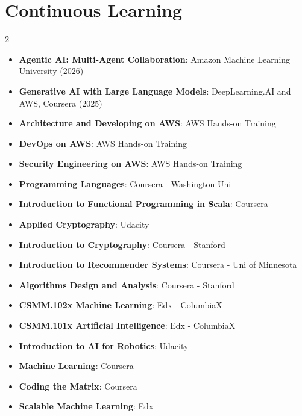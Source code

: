 \documentclass[letterpaper,11pt]{article}
\newcommand{\resumeColItem}[2]{\item\small{\textbf{#1}{: #2}}\par\vspace{-6pt}}
\newcommand{\resumeSubHeadingListStart}{\begin{itemize}[leftmargin=*]}
\newcommand{\resumeSubHeadingListEnd}{\end{itemize}}
\begin{document}
  
\section{Continuous Learning \footnotemark}
  \begin{multicols}{2}
  \raggedcolumns
   \resumeSubHeadingListStart
	\resumeColItem{Agentic AI: Multi-Agent Collaboration}{Amazon Machine Learning University (2026)}
    \resumeColItem{Generative AI with Large Language Models}{DeepLearning.AI and AWS, Coursera (2025)}
    \resumeColItem{Architecture and Developing on AWS}{AWS Hands-on Training}
	\resumeColItem{DevOps on AWS}{AWS Hands-on Training}
	\resumeColItem{Security Engineering on AWS}{AWS Hands-on Training}
    \resumeColItem{Programming Languages}{Coursera - Washington Uni}
    \resumeColItem{Introduction to Functional Programming in Scala}{Coursera}
    \resumeColItem{Applied Cryptography}{Udacity}
    \resumeColItem{Introduction to Cryptography}{Coursera - Stanford}
    \resumeColItem{Introduction to Recommender Systems}{Coursera - Uni of Minnesota}
    \resumeColItem{Algorithms Design and Analysis}{Coursera - Stanford}
    \resumeColItem{CSMM.102x Machine Learning}{Edx - ColumbiaX}
    \resumeColItem{CSMM.101x Artificial Intelligence}{Edx - ColumbiaX}
    \resumeColItem{Introduction to AI for Robotics}{Udacity}
    \resumeColItem{Machine Learning}{Coursera}
    \resumeColItem{Coding the Matrix}{Coursera}
    \resumeColItem{Scalable Machine Learning}{Edx}
  \resumeSubHeadingListEnd
  \end{multicols}




\end{document}
